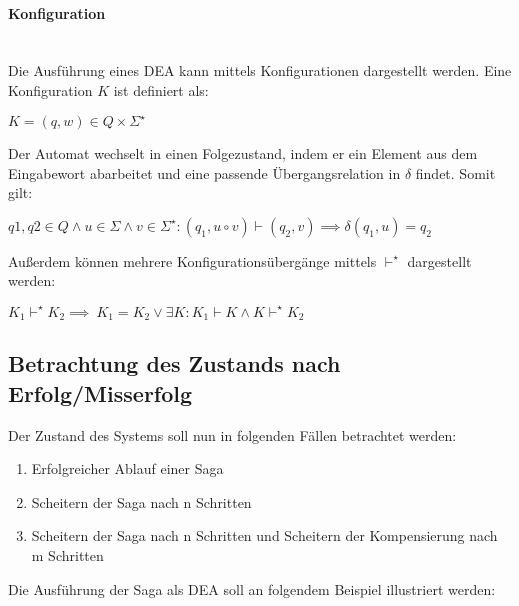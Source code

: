 \paragraph*{Konfiguration}\mbox{}\\
Die Ausführung eines DEA kann mittels Konfigurationen dargestellt werden. Eine Konfiguration $K$ ist definiert als: 

\begin{center}
	$K = (q, w) \in Q \times \Sigma^{\star}$
\end{center}

Der Automat wechselt in einen Folgezustand, indem er ein Element aus dem Eingabewort abarbeitet und eine passende Übergangsrelation in $\delta$ findet. Somit gilt:

\begin{center}
	$q1, q2 \in Q \land u \in \Sigma \land v \in \Sigma^{\star}: (q_{1}, u \circ v)\vdash (q_{2}, v) \implies \delta(q_{1}, u) = q_{2}$
\end{center}

Außerdem können mehrere Konfigurationsübergänge mittels $\vdash^{\star}$ dargestellt werden:

\begin{center}
	$K_1 \vdash^{\star} K_2 \implies \ K_1 = K_2 \lor \exists K: K_1 \vdash K \land K \vdash^{\star} K_2$
\end{center}

\subsection{Betrachtung des Zustands nach Erfolg/Misserfolg}\label{subsubsection_dea_simple}
Der Zustand des Systems soll nun in folgenden Fällen betrachtet werden:
\begin{enumerate}%
	\item Erfolgreicher Ablauf einer Saga
	\item Scheitern der Saga nach n Schritten
	\item Scheitern der Saga nach n Schritten und Scheitern der Kompensierung nach m Schritten
\end{enumerate}

Die Ausführung der Saga als DEA soll an folgendem Beispiel illustriert werden:

